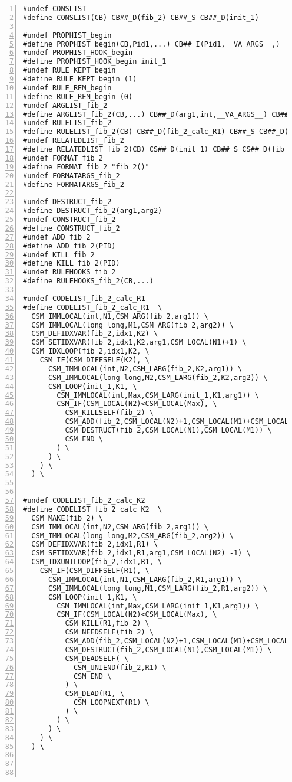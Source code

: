 {\scriptsize
\begin{Verbatim}[frame=single,numbers=left]
#undef CONSLIST
#define CONSLIST(CB) CB##_D(fib_2) CB##_S CB##_D(init_1)

#undef PROPHIST_begin
#define PROPHIST_begin(CB,Pid1,...) CB##_I(Pid1,__VA_ARGS__,)
#undef PROPHIST_HOOK_begin
#define PROPHIST_HOOK_begin init_1
#undef RULE_KEPT_begin
#define RULE_KEPT_begin (1)
#undef RULE_REM_begin
#define RULE_REM_begin (0)
#undef ARGLIST_fib_2
#define ARGLIST_fib_2(CB,...) CB##_D(arg1,int,__VA_ARGS__) CB##_S CB##_D(arg2,long long,__VA_ARGS__)
#undef RULELIST_fib_2
#define RULELIST_fib_2(CB) CB##_D(fib_2_calc_R1) CB##_S CB##_D(fib_2_calc_K2)
#undef RELATEDLIST_fib_2
#define RELATEDLIST_fib_2(CB) CS##_D(init_1) CB##_S CS##_D(fib_2)
#undef FORMAT_fib_2
#define FORMAT_fib_2 "fib_2()"
#undef FORMATARGS_fib_2
#define FORMATARGS_fib_2 

#undef DESTRUCT_fib_2
#define DESTRUCT_fib_2(arg1,arg2) 
#undef CONSTRUCT_fib_2
#define CONSTRUCT_fib_2 
#undef ADD_fib_2
#define ADD_fib_2(PID) 
#undef KILL_fib_2
#define KILL_fib_2(PID) 
#undef RULEHOOKS_fib_2
#define RULEHOOKS_fib_2(CB,...) 

#undef CODELIST_fib_2_calc_R1
#define CODELIST_fib_2_calc_R1  \
  CSM_IMMLOCAL(int,N1,CSM_ARG(fib_2,arg1)) \
  CSM_IMMLOCAL(long long,M1,CSM_ARG(fib_2,arg2)) \
  CSM_DEFIDXVAR(fib_2,idx1,K2) \
  CSM_SETIDXVAR(fib_2,idx1,K2,arg1,CSM_LOCAL(N1)+1) \
  CSM_IDXLOOP(fib_2,idx1,K2, \
    CSM_IF(CSM_DIFFSELF(K2), \
      CSM_IMMLOCAL(int,N2,CSM_LARG(fib_2,K2,arg1)) \
      CSM_IMMLOCAL(long long,M2,CSM_LARG(fib_2,K2,arg2)) \
      CSM_LOOP(init_1,K1, \
        CSM_IMMLOCAL(int,Max,CSM_LARG(init_1,K1,arg1)) \
        CSM_IF(CSM_LOCAL(N2)<CSM_LOCAL(Max), \
          CSM_KILLSELF(fib_2) \
          CSM_ADD(fib_2,CSM_LOCAL(N2)+1,CSM_LOCAL(M1)+CSM_LOCAL(M2)) \
          CSM_DESTRUCT(fib_2,CSM_LOCAL(N1),CSM_LOCAL(M1)) \
          CSM_END \
        ) \
      ) \
    ) \
  ) \


#undef CODELIST_fib_2_calc_K2
#define CODELIST_fib_2_calc_K2  \
  CSM_MAKE(fib_2) \
  CSM_IMMLOCAL(int,N2,CSM_ARG(fib_2,arg1)) \
  CSM_IMMLOCAL(long long,M2,CSM_ARG(fib_2,arg2)) \
  CSM_DEFIDXVAR(fib_2,idx1,R1) \
  CSM_SETIDXVAR(fib_2,idx1,R1,arg1,CSM_LOCAL(N2) -1) \
  CSM_IDXUNILOOP(fib_2,idx1,R1, \
    CSM_IF(CSM_DIFFSELF(R1), \
      CSM_IMMLOCAL(int,N1,CSM_LARG(fib_2,R1,arg1)) \
      CSM_IMMLOCAL(long long,M1,CSM_LARG(fib_2,R1,arg2)) \
      CSM_LOOP(init_1,K1, \
        CSM_IMMLOCAL(int,Max,CSM_LARG(init_1,K1,arg1)) \
        CSM_IF(CSM_LOCAL(N2)<CSM_LOCAL(Max), \
          CSM_KILL(R1,fib_2) \
          CSM_NEEDSELF(fib_2) \
          CSM_ADD(fib_2,CSM_LOCAL(N2)+1,CSM_LOCAL(M1)+CSM_LOCAL(M2)) \
          CSM_DESTRUCT(fib_2,CSM_LOCAL(N1),CSM_LOCAL(M1)) \
          CSM_DEADSELF( \
            CSM_UNIEND(fib_2,R1) \
            CSM_END \
          ) \
          CSM_DEAD(R1, \
            CSM_LOOPNEXT(R1) \
          ) \
        ) \
      ) \
    ) \
  ) \




\end{Verbatim}}
